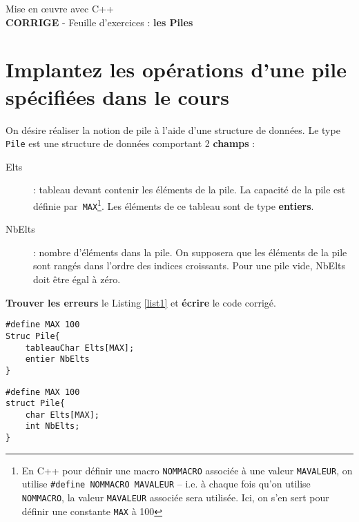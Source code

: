 \documentclass[french]{article}
\begin{document}
	
	\begin{minipage}{\textwidth}
		\begin{center}
			
			{\Large Mise en œuvre avec C++ \\ {\color{red}\textbf{CORRIGE}} - Feuille d'exercices : \textbf{les Piles}}
		\end{center}
	\end{minipage}
	\section{Implantez les opérations d’une pile spécifiées dans le cours}
On désire réaliser la notion de pile à l'aide d'une structure de données. 
Le type \texttt{Pile} est une structure de données comportant 2 \textbf{champs} :
\begin{description}
	\item[Elts] : tableau devant contenir les éléments de la pile. La capacité de la pile est définie par~\texttt{MAX}\footnote{En C++ pour définir une macro \texttt{NOMMACRO} associée à une valeur \texttt{MAVALEUR}, on utilise \texttt{\#define NOMMACRO MAVALEUR} -- i.e. à chaque fois qu'on utilise \texttt{NOMMACRO}, la valeur \texttt{MAVALEUR} associée sera utilisée. Ici, on s'en sert pour définir une constante \texttt{MAX} à 100}. Les éléments de ce tableau sont de type \textbf{entiers}.
	\item[NbElts] : nombre d’éléments dans la pile. On supposera que les éléments de la pile sont rangés dans l’ordre des indices croissants. Pour une pile vide, NbElts doit être égal à zéro.
\end{description}

\textbf{Trouver les erreurs} le Listing \ref{list1} et \textbf{écrire} le code corrigé.

\noindent\begin{minipage}{.45\textwidth}
	\begin{lstlisting}[caption={A corriger: Structure Pile},label=list1]
#define MAX 100
Struc Pile{
	tableauChar Elts[MAX];
	entier NbElts
} 
\end{lstlisting}
\end{minipage}\hfill
\begin{minipage}{.45\textwidth}
\begin{lstlisting}[caption={Corrigé: Structure Pile},label=list1]
#define MAX 100
struct Pile{
	char Elts[MAX];
	int NbElts;
} 
\end{lstlisting}
\end{minipage}
\end{document}
